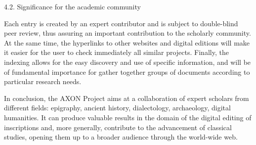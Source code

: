 \documentclass[amsthm,ebook]{saparticle}
\begin{document}
\bigskip


\bigskip

4.2. Significance for the academic community


\bigskip

Each entry is created by an expert contributor and is subject to double-blind peer review, thus assuring an important
contribution to the scholarly community. At the same time, the hyperlinks to other websites and digital editions will
make it easier for the user to check immediately all similar projects. Finally, the indexing allows for the easy
discovery and use of specific information, and will be of fundamental importance for gather together groups of
documents according to particular research needs.

In conclusion, the AXON Project aims at a collaboration of expert scholars from different fields: epigraphy, ancient
history, dialectology, archaeology, digital humanities. It can produce valuable results in the domain of the digital
editing of inscriptions and, more generally, contribute to the advancement of classical studies, opening them up to a
broader audience through the world-wide web.




\end{document}
